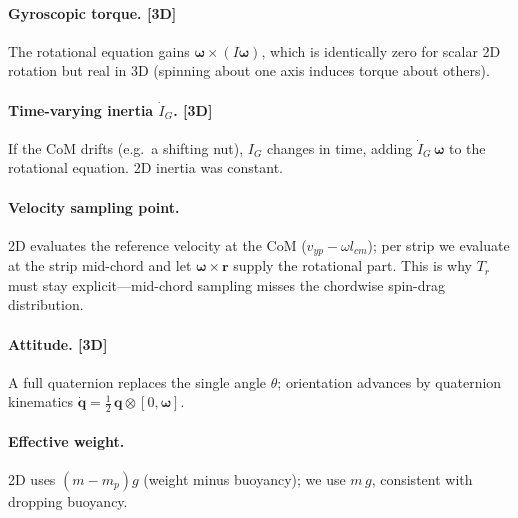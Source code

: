 \documentclass[11pt]{article}
\newcommand{\newin}{{\small\textbf{\color{blue}[3D]}}}
\begin{document}
\paragraph{Gyroscopic torque. \newin{}} The rotational equation gains
$\boldsymbol\omega\times(I\boldsymbol\omega)$, which is identically zero for scalar
2D rotation but real in 3D (spinning about one axis induces torque about others).

\paragraph{Time-varying inertia $\dot I_G$. \newin{}} If the CoM drifts (e.g.\ a
shifting nut), $I_G$ changes in time, adding $\dot I_G\,\boldsymbol\omega$ to the
rotational equation. 2D inertia was constant.

\paragraph{Velocity sampling point.} 2D evaluates the reference velocity at the
CoM ($v_{yp}-\omega l_{cm}$); per strip we evaluate at the strip mid-chord and let
$\boldsymbol\omega\times\mathbf r$ supply the rotational part. This is why $T_r$ must
stay explicit---mid-chord sampling misses the chordwise spin-drag distribution.

\paragraph{Attitude. \newin{}} A full quaternion replaces the single angle
$\theta$; orientation advances by quaternion kinematics
$\dot{\mathbf q}=\tfrac12\,\mathbf q\otimes[0,\boldsymbol\omega]$.

\paragraph{Effective weight.} 2D uses $(m-m_p)g$ (weight minus buoyancy); we use
$m\,g$, consistent with dropping buoyancy.
\end{document}
